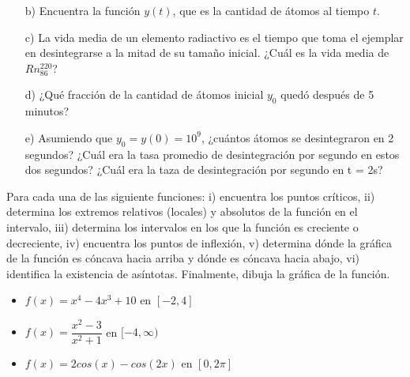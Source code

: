 \documentclass[10pt]{exam}
\begin{document}
\begin{questions}
\begin{itemize}
    \item [b)] Encuentra la función $y(t)$, que es la cantidad de átomos al tiempo $t$.

    \item [c)] La vida media de un elemento radiactivo es el tiempo que toma el ejemplar en desintegrarse a la mitad de su tamaño inicial. ¿Cuál es la vida media de $Rn^{220}_{86}$?

    \item [d)] ¿Qué fracción de la cantidad de átomos inicial $y_0$ quedó después de 5 minutos?

    \item [e)]  Asumiendo que $y_0 = y(0) = 10^9$, ¿cuántos átomos se desintegraron en 2 segundos? ¿Cuál era la tasa promedio de desintegración por segundo en estos dos segundos? ¿Cuál era la taza de desintegración por segundo en t = 2s?
\end{itemize}



\question Para cada una de las siguiente funciones: i) encuentra los puntos críticos, ii) determina los extremos relativos (locales) y absolutos de la función en el intervalo, iii) determina los intervalos en los que la función es creciente o decreciente, iv) encuentra los puntos de inflexión, v) determina dónde la gráfica de la función es cóncava hacia arriba y dónde es cóncava hacia abajo, vi) identifica la existencia de asíntotas. Finalmente, dibuja la gráfica de la función.

\begin{itemize}
    \item $f(x)=x^4-4x^3+10$ en $[-2,4]$
    \item $f(x)=\dfrac{x^2 -3}{x^2 +1}$ en $[-4,\infty)$
    \item $f(x)=2cos(x)-cos(2x)$ en $[0,2\pi]$
\end{itemize}




    \end{questions}




\pagestyle{foot}    %



\end{document}
